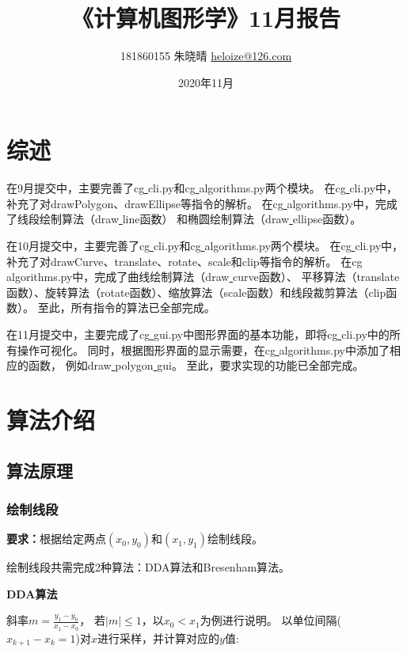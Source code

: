 \documentclass[a4paper,UTF8]{article}
\theoremstyle{definition}
\begin{document}
\title{\textbf{《计算机图形学》11月报告}}
\author{181860155 朱晓晴 \href{mailto:heloize@126.com}{heloize@126.com}}
\date{2020年11月}
\maketitle

\section{综述}
在9月提交中，主要完善了cg\underline{ }cli.py和cg\underline{ }algorithms.py两个模块。
在cg\underline{ }cli.py中，补充了对drawPolygon、drawEllipse等指令的解析。
在cg\underline{ }algorithms.py中，完成了线段绘制算法（draw\underline{ }line函数）
和椭圆绘制算法（draw\underline{ }ellipse函数）。

在10月提交中，主要完善了cg\underline{ }cli.py和cg\underline{ }algorithms.py两个模块。
在cg\underline{ }cli.py中，补充了对drawCurve、translate、rotate、scale和clip等指令的解析。
在cg\underline{ }algorithms.py中，完成了曲线绘制算法（draw\underline{ }curve函数）、
平移算法（translate函数）、旋转算法（rotate函数）、缩放算法（scale函数）和线段裁剪算法（clip函数）。
至此，所有指令的算法已全部完成。

在11月提交中，主要完成了cg\underline{ }gui.py中图形界面的基本功能，即将cg\underline{ }cli.py中的所有操作可视化。
同时，根据图形界面的显示需要，在cg\underline{ }algorithms.py中添加了相应的函数，
例如draw\underline{ }polygon\underline{ }gui。
至此，要求实现的功能已全部完成。


\section{算法介绍}
\subsection{算法原理}
\subsubsection{绘制线段}
\textbf{要求：}根据给定两点$(x_0,y_0)$和$(x_1,y_1)$绘制线段。

绘制线段共需完成2种算法：DDA算法和Bresenham算法。

\textbf{DDA算法}

斜率$m=\frac{y_1-y_0}{x_1-x_0}$，
若$|m|\leqslant 1$，以$x_0<x_1$为例进行说明。
以单位间隔($x_{k+1}-x_k=1$)对$x$进行采样，并计算对应的$y$值:
\end{document}
